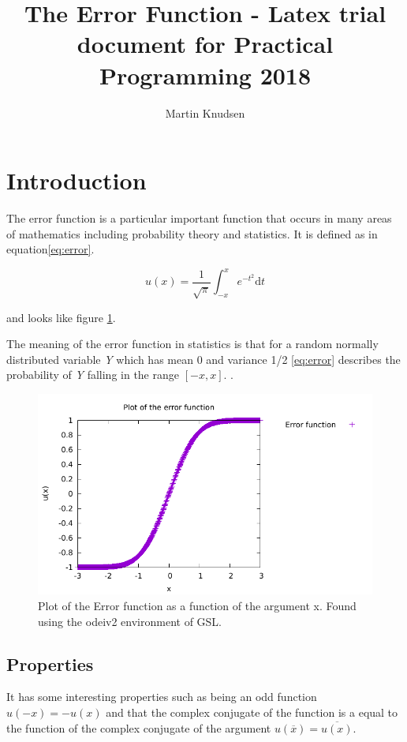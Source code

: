 \documentclass{report}
\author{Martin Knudsen}
\title{The Error Function - Latex trial document for Practical Programming 2018}
\begin{document}
\maketitle

\section*{Introduction}
The error function is a particular important function that occurs in many areas of mathematics including probability theory and statistics. It is defined as in equation\eqref{eq:error}.\cite{wiki} 

\begin{equation}
u(x) = \frac{1}{\sqrt{\pi}}\int ^x_{-x}e^{-t^2}\mathrm{d}t
\label{eq:error}
\end{equation} 

and looks like figure \ref{fig:error}. 

The meaning of the error function in statistics is that for a random normally distributed variable \textit{Y} which has mean 0 and variance 1/2 \eqref{eq:error} describes the probability of \textit{Y} falling in the range $[-x,x]$. \cite{wiki}. 

\begin{figure}[tbph]
\includegraphics[width=1.0\textwidth]{error_function_plot}
\caption{Plot of the Error function as a function of the argument x. Found using the odeiv2 environment of GSL. \label{fig:error}}
\end{figure}

\subsection*{Properties}
It has some interesting properties such as being an odd function $u(-x)=-u(x)$ and that the complex conjugate of the function is a equal to the function of the complex conjugate of the argument $u(\overline{x})=\overline{u(x)}$.\cite{wiki}
\end{document}
